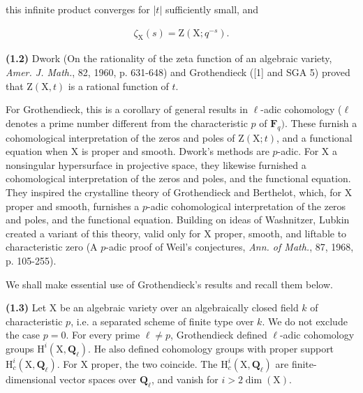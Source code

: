 \documentclass[10pt,leqno]{article}
\begin{document}
\noindent this infinite product converges for |\(t|\) sufficiently small, and\par

\begin{equation*}\begin{gathered}\zeta _{\mathrm{X}}(s) = \mathrm{Z}(\mathrm{X}; q^{- s}).\end{gathered}\tag{1.1.3}\end{equation*}

\noindent \textbf{(1.2)} Dwork (On the rationality of the zeta function of an algebraic variety, \emph{Amer. J. Math.}, 82, 1960, p. 631-648) and Grothendieck ([1] and SGA 5) proved that \(\mathrm{Z}(\mathrm{X},t)\) is a rational function of \(t\).\par

\noindent For Grothendieck, this is a corollary of general results in \(\ell \)-adic cohomology (\(\ell \) denotes a prime number different from the characteristic \(p\) of \(\mathbf{F}_{q})\). These furnish a cohomological interpretation of the zeros and poles of \(\mathrm{Z}(\mathrm{X};t)\), and a functional equation when \(\mathrm{X}\) is proper and smooth. Dwork’s methods are \(p\)-adic. For \(\mathrm{X}\) a nonsingular hypersurface in projective space, they likewise furnished a cohomological interpretation of the zeros and poles, and the functional equation. They inspired the crystalline theory of Grothendieck and Berthelot, which, for \(\mathrm{X}\) proper and smooth, furnishes a \(p\)-adic cohomological interpretation of the zeros and poles, and the functional equation. Building on ideas of Washnitzer, Lubkin created a variant of this theory, valid only for \(\mathrm{X}\) proper, smooth, and liftable to characteristic zero (A \(p\)-adic proof of Weil’s conjectures, \emph{Ann. of Math.}, 87, 1968, p. 105-255).\par

\noindent We shall make essential use of Grothendieck’s results and recall them below.\par

\noindent \textbf{(1.3)} Let \(\mathrm{X}\) be an algebraic variety over an algebraically closed field \(k\) of characteristic \(p\), i.e. a separated scheme of finite type over \(k\). We do not exclude the case \(p=0\). For every prime \(\ell \ne p\), Grothendieck defined \(\ell \)-adic cohomology groups \(\mathrm{H}^{i}(\mathrm{X},\mathbf{Q}_{\ell })\). He also defined cohomology groups with proper support \(\mathrm{H}_{c}^{i}(\mathrm{X},\mathbf{Q}_{\ell })\). For \(\mathrm{X}\) proper, the two coincide. The \(\mathrm{H}_{c}^{i}(\mathrm{X},\mathbf{Q}_{\ell })\) are finite-dimensional vector spaces over \(\mathbf{Q}_{\ell }\), and vanish for \(i>2 \operatorname{dim}(\mathrm{X})\).\par
\end{document}
